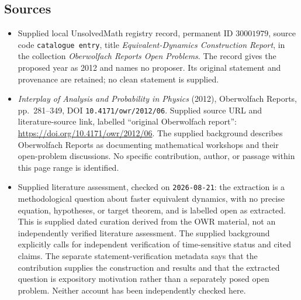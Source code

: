 \documentclass[11pt]{article}
\begin{document}
\subsection{Sources}
\begin{itemize}
\item [1] Supplied local UnsolvedMath registry record, permanent ID \(30001979\), source code \texttt{catalogue entry}, title \emph{Equivalent-Dynamics Construction Report}, in the collection \emph{Oberwolfach Reports Open Problems}. The record gives the proposed year as 2012 and names no proposer. Its original statement and provenance are retained; no clean statement is supplied.
\item [2] \emph{Interplay of Analysis and Probability in Physics} (2012), Oberwolfach Reports, pp.\ 281--349, DOI \texttt{10.4171/owr/2012/06}. Supplied source URL and literature-source link, labelled ``original Oberwolfach report'': \url{https://doi.org/10.4171/owr/2012/06}. The supplied background describes Oberwolfach Reports as documenting mathematical workshops and their open-problem discussions. No specific contribution, author, or passage within this page range is identified.
\item [3] Supplied literature assessment, checked on \texttt{2026-08-21}: the extraction is a methodological question about faster equivalent dynamics, with no precise equation, hypotheses, or target theorem, and is labelled open as extracted. This is supplied dated curation derived from the OWR material, not an independently verified literature assessment. The supplied background explicitly calls for independent verification of time-sensitive status and cited claims. The separate statement-verification metadata says that the contribution supplies the construction and results and that the extracted question is expository motivation rather than a separately posed open problem. Neither account has been independently checked here.
\end{itemize}
\end{document}
